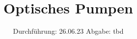

\subject{V21}
\title{Optisches Pumpen}
\date{
  Durchführung: 26.06.23
  \hspace{3em}
  Abgabe: tbd
}



\maketitle
\thispagestyle{empty}
\tableofcontents
\newpage








\newpage
\printbibliography{}
\nocite{matplotlib}
\nocite{numpy}
\nocite{scipy}
\nocite{uncertainties}
\nocite{reback2020pandas}

\newpage
% 


